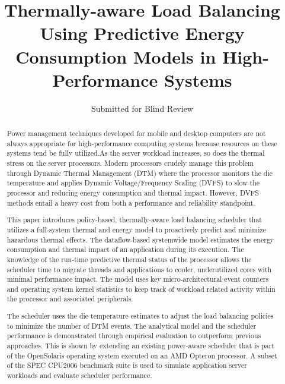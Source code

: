 \documentclass[times,10pt,onecolumn]{article}
\begin{document}
\title{Thermally-aware Load Balancing Using Predictive Energy
  Consumption Models in High-Performance Systems} 
\author{Submitted for Blind
  Review}
\maketitle
\newtheorem{defn}{Definition}
\newtheorem{thm}{Theorem}
\thispagestyle{empty}
\doublespacing
\begin{abstract}

 Power management techniques developed for mobile and desktop computers
  are not always appropriate for high-performance computing systems
  because resources on these systems tend be fully utilized.As the
  server workload increases, so does the thermal stress on the
  server processors.  Modern processors crudely manage this problem
  through Dynamic Thermal Management (DTM) where the processor monitors
  the die temperature and applies Dynamic Voltage/Frequency Scaling
  (DVFS) to slow the processor and reducing energy consumption and
  thermal impact.  However, DVFS methods entail a heavy
  cost from both a performance and reliability standpoint.

  This paper introduces policy-based, thermally-aware load balancing
  scheduler that utilizes a full-system thermal and energy model to
  proactively predict and minimize hazardous thermal effects. The
  dataflow-based systemwide model estimates the energy consumption and
  thermal impact of an application during its execution. The knowledge
  of the run-time predictive thermal status of the processor allows the
  scheduler time to migrate threads and applications to cooler,
  underutilized cores with minimal performance impact. The model uses
  key micro-architectural event counters and operating system kernel
  statistics to keep track of workload related activity within the
  processor and associated peripherals.

  The scheduler uses the die temperature estimates to adjust the load
  balancing policies to minimize the number of DTM events.  The
  analytical model and the scheduler performance is demonstrated through
  empirical evaluation to outperform previous approaches. This is shown
  by extending an existing power-aware scheduler that is part of the
  OpenSolaris operating system executed on an AMD Opteron processor.  A
  subset of the SPEC CPU2006 benchmark suite is used to simulate
  application server workloads and evaluate scheduler performance.


\end{abstract}
\end{document}
